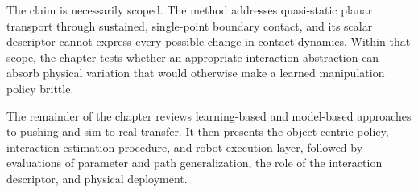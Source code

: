 The claim is necessarily scoped. The method addresses quasi-static planar transport through sustained, single-point boundary contact, and its scalar descriptor cannot express every possible change in contact dynamics. Within that scope, the chapter tests whether an appropriate interaction abstraction can absorb physical variation that would otherwise make a learned manipulation policy brittle.

The remainder of the chapter reviews learning-based and model-based approaches to pushing and sim-to-real transfer. It then presents the object-centric policy, interaction-estimation procedure, and robot execution layer, followed by evaluations of parameter and path generalization, the role of the interaction descriptor, and physical deployment.
